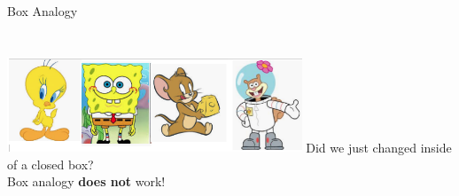     \begin{frame}{Box Analogy}
        \pause
        \inputminted[frame=single,framesep=2pt,firstline=8,lastline=10]{python3}{code-examples/cartoons_box_analogy.py}
        \pause
        \inputminted[frame=single,framesep=2pt,firstline=12, lastline=15]{python3}{code-examples/cartoons_box_analogy.py}
        \pause
        \includegraphics[width=0.66\textwidth]{images/list_cartoons/box_analogy.png}
        \newline
        \pause
        Did we just changed inside of a closed box?\\
        \pause 
         Box analogy \textbf{does not} work!
    \end{frame}

